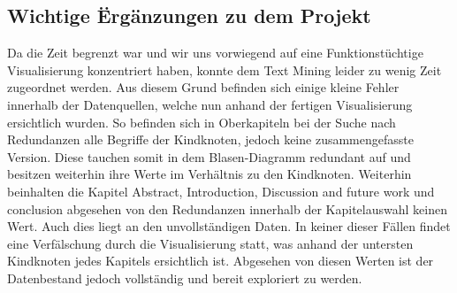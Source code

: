 \subsection*{Wichtige \"Erg\"anzungen zu dem Projekt}
Da die Zeit begrenzt war und wir uns vorwiegend auf eine Funktionst\"uchtige Visualisierung konzentriert haben, konnte dem Text Mining leider zu wenig Zeit zugeordnet werden. Aus diesem Grund befinden sich einige kleine Fehler innerhalb der Datenquellen, welche nun anhand der fertigen Visualisierung ersichtlich wurden. So befinden sich in Oberkapiteln bei der Suche nach Redundanzen alle Begriffe der Kindknoten, jedoch keine zusammengefasste Version. Diese tauchen somit in dem Blasen-Diagramm redundant auf und besitzen weiterhin ihre Werte im Verh\"altnis zu den Kindknoten. Weiterhin beinhalten die Kapitel Abstract, Introduction, Discussion and future work und conclusion abgesehen von den Redundanzen innerhalb der Kapitelauswahl keinen Wert. Auch dies liegt an den unvollst\"andigen Daten. In keiner dieser F\"allen findet eine Verf\"alschung durch die Visualisierung statt, was anhand der untersten Kindknoten jedes Kapitels ersichtlich ist. Abgesehen von diesen Werten ist der Datenbestand jedoch vollst\"andig und bereit exploriert zu werden.